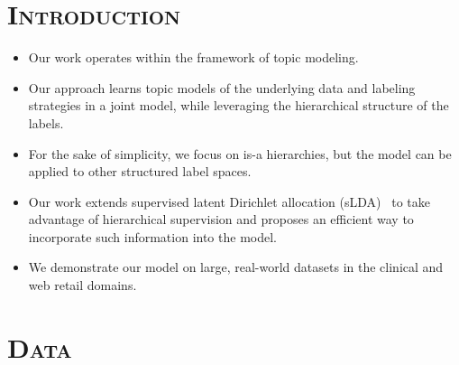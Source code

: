 \documentclass[portrait]{sciposter}
\begin{document}
\begin{multicols}{3}

\section{\textsc{Introduction}}

\begin{itemize}
\item Our work operates within the framework of topic modeling. 
\item Our approach learns
topic models of the underlying data and labeling strategies in a joint model,
while leveraging the hierarchical structure of the labels. 
\item For the sake of
simplicity, we focus on is-a hierarchies, but the model can be
applied to other structured label spaces. 
\item Our work extends supervised latent Dirichlet
allocation (sLDA)~\citep{BleiMcAuliffe2008} to take advantage of hierarchical
supervision and proposes an efficient way to incorporate such information into the model. 
\item We demonstrate our model on large, real-world datasets in the clinical and web
retail domains.
\end{itemize}






\section{\textsc{Data}}


\end{multicols}
\end{document}
